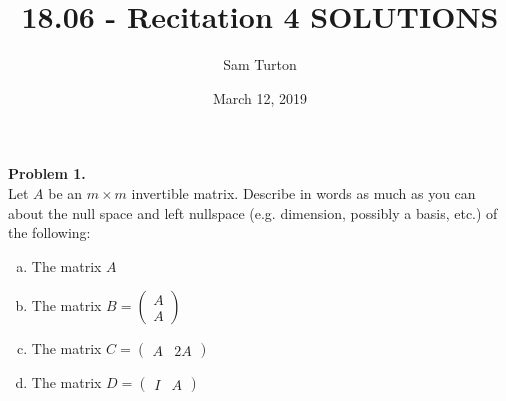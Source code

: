 \documentclass[11pt]{article}
\title{18.06 - Recitation 4 SOLUTIONS}
\author{Sam Turton}
\date{March 12, 2019}
\begin{document}
\maketitle

\noindent \textbf{Problem 1.}\\
Let $A$ be an $m\times m$ invertible matrix. Describe in words as much as you can about the null space and left nullspace (e.g. dimension, possibly a basis, etc.) of the following:
\begin{enumerate}[(a)]
\item The matrix $A$
\item The matrix $B = \begin{pmatrix} A \\ A \end{pmatrix}$
\item The matrix $C =\begin{pmatrix} A & 2A \end{pmatrix}$
\item The matrix $D = \begin{pmatrix} I & A \end{pmatrix}$
\end{enumerate}

\
\end{document}
